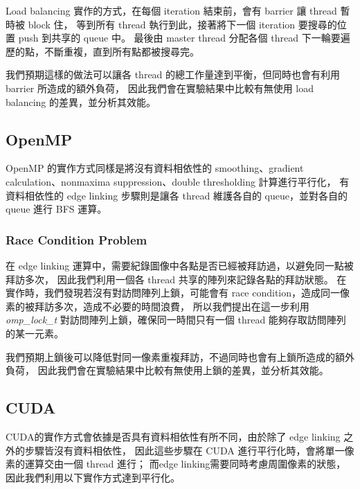 \documentclass[sigconf,nonacm]{acmart}
\begin{document}
Load balancing 實作的方式，在每個 iteration 結束前，會有 barrier 讓 thread 暫時被 block 住，
等到所有 thread 執行到此，接著將下一個 iteration 要搜尋的位置 push 到共享的 queue 中。
最後由 master thread 分配各個 thread 下一輪要遍歷的點，不斷重複，直到所有點都被搜尋完。

我們預期這樣的做法可以讓各 thread 的總工作量達到平衡，但同時也會有利用 barrier 所造成的額外負荷，
因此我們會在實驗結果中比較有無使用 load balancing 的差異，並分析其效能。

\subsection{OpenMP}

OpenMP 的實作方式同樣是將沒有資料相依性的 smoothing、gradient calculation、nonmaxima suppression、double thresholding 計算進行平行化，
有資料相依性的 edge linking 步驟則是讓各 thread 維護各自的 queue，並對各自的 queue 進行 BFS 運算。

\subsubsection{Race Condition Problem} \label{race_condition}

在 edge linking 運算中，需要紀錄圖像中各點是否已經被拜訪過，以避免同一點被拜訪多次，
因此我們利用一個各 thread 共享的陣列來記錄各點的拜訪狀態。
在實作時，我們發現若沒有對訪問陣列上鎖，可能會有 race condition，造成同一像素的被拜訪多次，造成不必要的時間浪費，
所以我們提出在這一步利用 \emph{omp\_lock\_t} 對訪問陣列上鎖，確保同一時間只有一個 thread 能夠存取訪問陣列的某一元素。

我們預期上鎖後可以降低對同一像素重複拜訪，不過同時也會有上鎖所造成的額外負荷，
因此我們會在實驗結果中比較有無使用上鎖的差異，並分析其效能。

\subsection{CUDA}

CUDA的實作方式會依據是否具有資料相依性有所不同，由於除了 edge linking 之外的步驟皆沒有資料相依性，
因此這些步驟在 CUDA 進行平行化時，會將單一像素的運算交由一個 thread 進行；
而edge linking需要同時考慮周圍像素的狀態，因此我們利用以下實作方式達到平行化。
\end{document}
